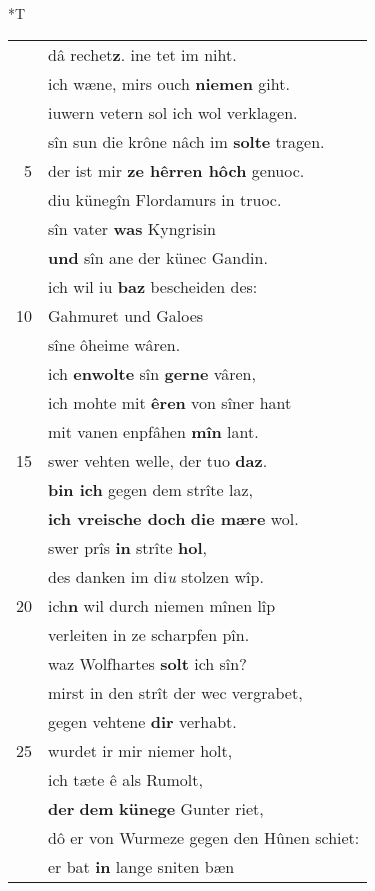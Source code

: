 \documentclass[8pt,a4paper,notitlepage]{article}
\begin{document}
\begin{table}[ht]
\begin{minipage}[t]{0.5\linewidth}
\small
\begin{center}*T
\end{center}
\begin{tabular}{rl}
 & dâ rechet\textbf{z}. ine tet im niht.\\ 
 & ich wæne, mirs ouch \textbf{niemen} giht.\\ 
 & iuwern vetern sol ich wol verklagen.\\ 
 & sîn sun die krône nâch im \textbf{solte} tragen.\\ 
5 & der ist mir \textbf{ze hêrren hôch} genuoc.\\ 
 & diu künegîn Flordamurs in truoc.\\ 
 & sîn vater \textbf{was} Kyngrisin\\ 
 & \textbf{und} sîn ane der künec Gandin.\\ 
 & ich wil iu \textbf{baz} bescheiden des:\\ 
10 & Gahmuret und Galoes\\ 
 & sîne ôheime wâren.\\ 
 & ich \textbf{en}\textbf{wolte} sîn \textbf{gerne} vâren,\\ 
 & ich mohte mit \textbf{êren} von sîner hant\\ 
 & mit vanen enpfâhen \textbf{mîn} lant.\\ 
15 & swer vehten welle, der tuo \textbf{daz}.\\ 
 & \textbf{bin ich} gegen dem strîte laz,\\ 
 & \textbf{ich vreische doch} \textbf{die mære} wol.\\ 
 & swer prîs \textbf{in} strîte \textbf{hol},\\ 
 & des danken im di\textit{u} stolzen wîp.\\ 
20 & ich\textbf{n} wil durch niemen mînen lîp\\ 
 & verleiten in ze scharpfen pîn.\\ 
 & waz Wolfhartes \textbf{solt} ich sîn?\\ 
 & mirst in den strît der wec vergrabet,\\ 
 & gegen vehtene \textbf{dir} verhabt.\\ 
25 & wurdet ir mir niemer holt,\\ 
 & ich tæte ê als Rumolt,\\ 
 & \textbf{der} \textbf{dem} \textbf{künege} Gunter riet,\\ 
 & dô er von Wurmeze gegen den Hûnen schiet:\\ 
 & er bat \textbf{in} lange sniten bæn\\ 

\end{tabular}
\end{minipage}
\end{table}
\end{document}
